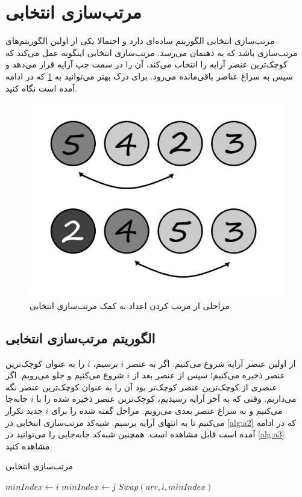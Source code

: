 \documentclass[12pt]{article}
\begin{document}
\section{مرتب‌سازی انتخابی\protect{}}

مرتب‌سازی انتخابی الگوریتم ساده‌ای دارد و
احتمالا یکی از اولین الگوریتم‌های مرتب‌سازی باشد که به ذهنمان می‌رسد.
مرتب‌سازی انتخابی اینگونه عمل می‌کند که کوچک‌ترین عنصر آرایه را انتخاب می‌کند، آن را در سمت چپ آرایه قرار می‌دهد
و سپس به سراغ عناصر باقی‌مانده می‌رود.
\cite{clrs}
برای درک بهتر می‌توانید به
\cref{fig:f2}
که در ادامه آمده است
نگاه کنید.

\begin{figure}[H]
  \centering
  \includegraphics[width=.8\textwidth]{figs/selectionSort.jpg}
  \caption{
    مراحلی از مرتب کردن اعداد به کمک مرتب‌سازی انتخابی
  }
  \label{fig:f2}
\end{figure}

\subsection*{الگوریتم مرتب‌سازی انتخابی}
از اولین عنصر آرایه شروع می‌کنیم. اگر به عنصر
$i$
برسیم،
$i$
را به عنوان کوچک‌ترین عنصر ذخیره می‌کنیم؛
سپس از عنصر بعد از
$i$
شروع می‌کنیم و جلو می‌رویم.
اگر عنصری از
کوچک‌ترین عنصر
کوچک‌تر بود
آن را به عنوان کوچک‌ترین عنصر نگه می‌داریم.
وقتی که به آخر آرایه رسیدیم،
کوچک‌ترین عنصر ذخیره شده را با
$i$
جابه‌جا می‌کنیم
و به سراغ عنصر بعدی می‌رویم.
مراحل گفته شده را برای
$i$
جدید تکرار می‌کنیم
تا به انتهای آرایه برسیم.
شبه‌کد مرتب‌سازی انتخابی در
\cref{alg:a2}
که در ادامه آمده است قابل مشاهده است.
همچنین شبه‌کد جابه‌جایی را می‌توانید در
\cref{alg:a3}
مشاهده کنید.

\begin{algorithm}[H]
  \caption{مرتب‌سازی انتخابی}
  \label{alg:a2}
  \begin{latin}
    \begin{algorithmic}[1]
      \State $minIndex \gets i$
      \State $minIndex \gets j$
      \EndIf
      \EndFor
      \State $Swap(arr, i, minIndex)$
      \EndFor
      \EndProcedure
    \end{algorithmic}
  \end{latin}
\end{algorithm}
\end{document}
